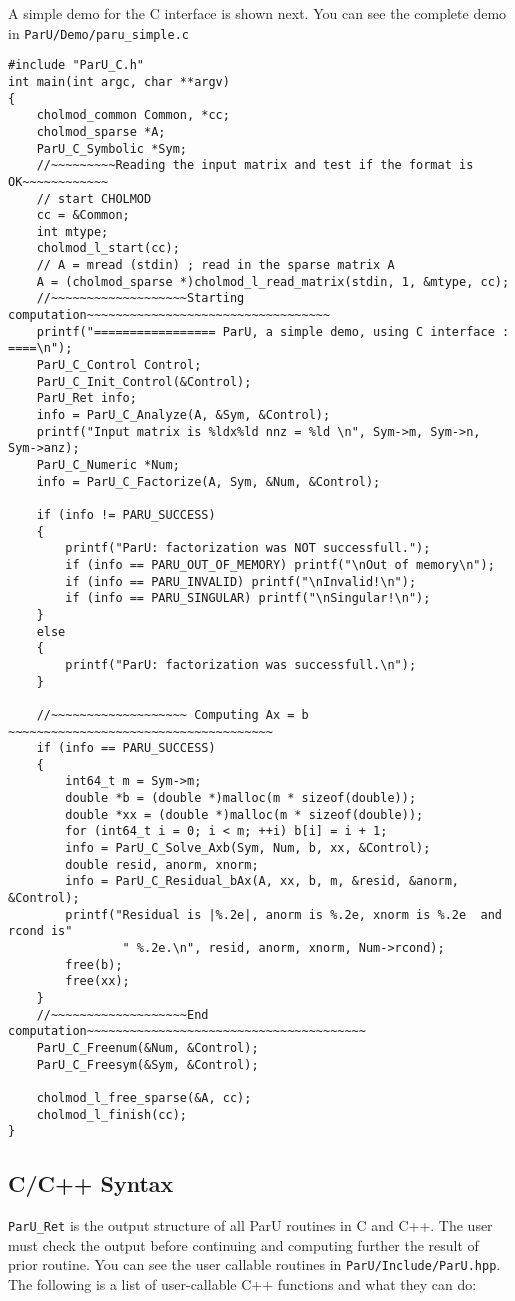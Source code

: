\documentclass[12pt]{article}
\begin{document}
A simple demo for the C interface is shown next. You can see the complete demo
in \verb'ParU/Demo/paru_simple.c'
\begin{verbatim}
#include "ParU_C.h"
int main(int argc, char **argv)
{
    cholmod_common Common, *cc;
    cholmod_sparse *A;
    ParU_C_Symbolic *Sym;
    //~~~~~~~~~Reading the input matrix and test if the format is OK~~~~~~~~~~~~
    // start CHOLMOD
    cc = &Common;
    int mtype;
    cholmod_l_start(cc);
    // A = mread (stdin) ; read in the sparse matrix A
    A = (cholmod_sparse *)cholmod_l_read_matrix(stdin, 1, &mtype, cc);
    //~~~~~~~~~~~~~~~~~~~Starting computation~~~~~~~~~~~~~~~~~~~~~~~~~~~~~~~~~~
    printf("================= ParU, a simple demo, using C interface : ====\n");
    ParU_C_Control Control;
    ParU_C_Init_Control(&Control);
    ParU_Ret info;
    info = ParU_C_Analyze(A, &Sym, &Control);
    printf("Input matrix is %ldx%ld nnz = %ld \n", Sym->m, Sym->n, Sym->anz);
    ParU_C_Numeric *Num;
    info = ParU_C_Factorize(A, Sym, &Num, &Control);

    if (info != PARU_SUCCESS)
    {
        printf("ParU: factorization was NOT successfull.");
        if (info == PARU_OUT_OF_MEMORY) printf("\nOut of memory\n");
        if (info == PARU_INVALID) printf("\nInvalid!\n");
        if (info == PARU_SINGULAR) printf("\nSingular!\n");
    }
    else
    {
        printf("ParU: factorization was successfull.\n");
    }

    //~~~~~~~~~~~~~~~~~~~ Computing Ax = b ~~~~~~~~~~~~~~~~~~~~~~~~~~~~~~~~~~~~~
    if (info == PARU_SUCCESS)
    {
        int64_t m = Sym->m;
        double *b = (double *)malloc(m * sizeof(double));
        double *xx = (double *)malloc(m * sizeof(double));
        for (int64_t i = 0; i < m; ++i) b[i] = i + 1;
        info = ParU_C_Solve_Axb(Sym, Num, b, xx, &Control);
        double resid, anorm, xnorm;
        info = ParU_C_Residual_bAx(A, xx, b, m, &resid, &anorm, &Control);
        printf("Residual is |%.2e|, anorm is %.2e, xnorm is %.2e  and rcond is"
                " %.2e.\n", resid, anorm, xnorm, Num->rcond);
        free(b);
        free(xx);
    }
    //~~~~~~~~~~~~~~~~~~~End computation~~~~~~~~~~~~~~~~~~~~~~~~~~~~~~~~~~~~~~~
    ParU_C_Freenum(&Num, &Control);
    ParU_C_Freesym(&Sym, &Control);

    cholmod_l_free_sparse(&A, cc);
    cholmod_l_finish(cc);
}
\end{verbatim}

\subsection{C/C++ Syntax}
\verb'ParU_Ret' is the output structure of all ParU routines in C and C++.  The 
user must check the output before continuing and computing further the result of
prior routine. You can see the user callable routines in 
\verb'ParU/Include/ParU.hpp'.
The following is a list of user-callable C++ functions and what they
can do:
\end{document}
